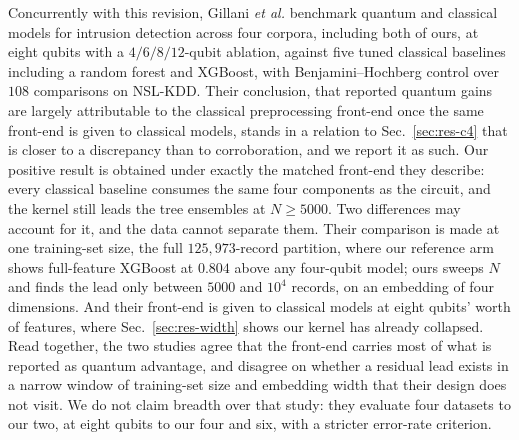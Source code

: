 \begin{revbody}
Concurrently with this revision, Gillani \emph{et al.} \cite{gillani2026}
benchmark quantum and classical models for intrusion detection across four
corpora, including both of ours, at eight qubits with a $4/6/8/12$-qubit
ablation, against five tuned classical baselines including a random forest and
XGBoost, with Benjamini--Hochberg control over $108$ comparisons on NSL-KDD.
Their conclusion, that reported quantum gains are largely attributable to the
classical preprocessing front-end once the same front-end is given to classical
models, stands in a relation to Sec.~\ref{sec:res-c4} that is closer to a
discrepancy than to corroboration, and we report it as such. Our positive
result is obtained under exactly the matched front-end they describe: every
classical baseline consumes the same four components as the circuit, and the
kernel still leads the tree ensembles at $N\geq5000$. Two differences may
account for it, and the data cannot separate them. Their comparison is made at
one training-set size, the full $125{,}973$-record partition, where our
reference arm shows full-feature XGBoost at $0.804$ above any four-qubit model;
ours sweeps $N$ and finds the lead only between $5000$ and $10^{4}$ records, on
an embedding of four dimensions. And their front-end is given to classical
models at eight qubits' worth of features, where Sec.~\ref{sec:res-width}
shows our kernel has already collapsed. Read together, the two studies agree
that the front-end carries most of what is reported as quantum advantage, and
disagree on whether a residual lead exists in a narrow window of training-set
size and embedding width that their design does not visit. We do not claim
breadth over that study: they evaluate four datasets to our two, at eight
qubits to our four and six, with a stricter error-rate criterion.
\end{revbody}

